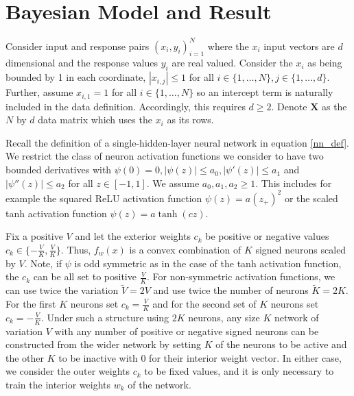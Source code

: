 \documentclass{article}
\numberwithin{equation}{section}
\theoremstyle{Lemma}
\theoremstyle{Corollary}
\theoremstyle{Theorem}
\theoremstyle{Remark}
\begin{document}
\section{Bayesian Model and Result}\label{model_section}
Consider input and response pairs $(x_{i}, y_{i})_{i=1}^{N}$ where the $x_{i}$ input vectors are $d$ dimensional and the response values $y_{i}$ are real valued. Consider the $x_{i}$ as being bounded by 1 in each coordinate, $|x_{i,j}| \leq 1$ for all $i \in \{1,\hdots,N\}, j \in\{1, \hdots,d\}$. Further, assume $x_{i,1}=1$ for all $i \in\{1,\hdots,N\}$ so an intercept term is naturally included in the data definition. Accordingly, this requires $d \geq 2$. Denote $\textbf{X}$ as the $N$ by $d$ data matrix which uses the $x_{i}$ as its rows.

Recall the definition of a single-hidden-layer neural network in equation \eqref{nn_def}. We restrict the class of neuron activation functions we consider to have two bounded derivatives with $\psi(0) = 0, |\psi(z)|\leq a_{0}, |\psi'(z)|\leq a_{1}$ and $|\psi''(z)|\leq a_{2}$ for all $z \in [-1,1]$. We assume $a_{0}, a_{1}, a_{2} \geq 1$. This includes for example the squared ReLU activation function $\psi(z) = a (z_{+})^{2}$ or the scaled tanh activation function $\psi(z) = a \tanh(cz)$.

Fix a positive $V$ and let the exterior weights $c_{k}$ be positive or negative values $c_{k} \in \{-\frac{V}{K},\frac{V}{K}\}$. Thus, $f_{w}(x)$ is a convex combination of $K$ signed neurons scaled by $V$. Note, if $\psi$ is odd symmetric as in the case of the tanh activation function, the $c_{k}$ can be all set to positive $\frac{V}{K}$. For non-symmetric activation functions, we can use twice the variation $\tilde{V} = 2V$ and use twice the number of neurons $\tilde{K} = 2K$. For the first $K$ neurons set $c_{k} = \frac{V}{K}$ and for the second set of $K$ neurons set $c_{k} = - \frac{V}{K}$. Under such a structure using $2K$ neurons, any size $K$ network of variation $V$ with any number of positive or negative signed neurons can be constructed from the wider network by setting $K$ of the neurons to be active and the other $K$ to be inactive with $0$ for their interior weight vector. In either case, we consider the outer weights $c_{k}$ to be fixed values, and it is only necessary to train the interior weights $w_{k}$ of the network.
\end{document}
